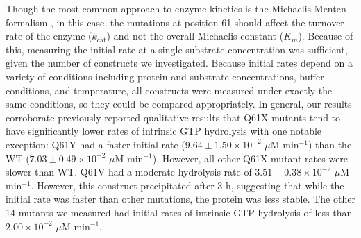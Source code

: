 Though the most common approach to enzyme kinetics is the Michaelis-Menten formalism \cite{Michaelis1913, Johnson2011}, in this case, the mutations at position 61 should affect the turnover rate of the enzyme ($k_{\text{cat}}$) and not the overall Michaelis constant ($K_m$). 
Because of this, measuring the initial rate at a single substrate concentration was sufficient, given the number of constructs we investigated. 
Because initial rates depend on a variety of conditions including protein and substrate concentrations, buffer conditions, and temperature, all constructs were measured under exactly the same conditions, so they could be compared appropriately. 
In general, our results corroborate previously reported qualitative results that Q61X mutants tend to have significantly lower rates of intrinsic GTP hydrolysis with one notable exception: Q61Y had a faster initial rate ($9.64 \pm 1.50 \times 10^{-2}$ $\mu$M min$^{-1}$) than the WT ($7.03 \pm 0.49 \times 10^{-2}$ $\mu$M min$^{-1}$). 
However, all other Q61X mutant rates were slower than WT. 
Q61V had a moderate hydrolysis rate of $3.51 \pm 0.38 \times 10^{-2}$ $\mu$M min$^{-1}$. 
However, this construct precipitated after 3 h, suggesting that while the initial rate was faster than other mutations, the protein was less stable. 
The other 14 mutants we measured had initial rates of intrinsic GTP hydrolysis of less than $2.00 \times 10^{-2}$ $\mu$M min$^{-1}$.

